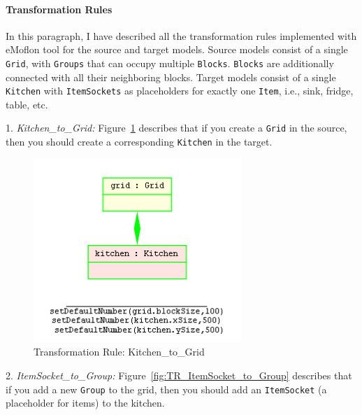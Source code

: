 

\paragraph{Transformation Rules} In this paragraph, I have described all the transformation rules implemented with eMoflon tool for the source and target models. Source models consist of a single \texttt{Grid}, with \texttt{Groups} that can occupy multiple \texttt{Blocks}. \texttt{Blocks} are additionally connected with all their neighboring blocks. Target models consist of a single \texttt{Kitchen} with \texttt{ItemSockets} as placeholders for exactly one \texttt{Item}, i.e., sink, fridge, table, etc.

1. \textit{Kitchen\_to\_Grid: }  Figure~\ref{fig:TR_Kitchen_to_Grid} describes that if you create a \texttt{Grid} in the source, then you should create a corresponding \texttt{Kitchen} in the target.

\begin{figure}[h]
	\centering
	\includegraphics[width=0.7\textwidth]{figures/TR_Kitchen_to_Grid}
	\caption{Transformation Rule: Kitchen\_to\_Grid}
	\label{fig:TR_Kitchen_to_Grid}
\end{figure}

2. \textit{ItemSocket\_to\_Group: } Figure~\ref{fig:TR_ItemSocket_to_Group} describes that if you add a new \texttt{Group} to the grid, then you should add an \texttt{ItemSocket} (a placeholder for items) to the kitchen.

